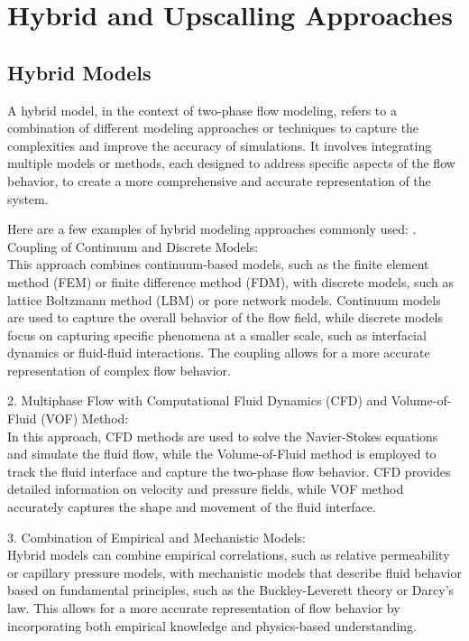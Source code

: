 \documentclass[letterpaper,12pt]{article}
\begin{document}
	
	\section{Hybrid and Upscalling Approaches}
	
	\subsection{Hybrid Models}
	  A hybrid model, in the context of two-phase flow modeling, refers to a combination of different modeling approaches or techniques to capture the complexities and improve the accuracy of simulations. It involves integrating multiple models or methods, each designed to address specific aspects of the flow behavior, to create a more comprehensive and accurate representation of the system.\smallskip
	
	 Here are a few examples of hybrid modeling approaches commonly used:
	. Coupling of Continuum and Discrete Models: \\
		This approach combines continuum-based models, such as the finite element method (FEM) or finite difference method (FDM), with discrete models, such as lattice Boltzmann method (LBM) or pore network models. Continuum models are used to capture the overall behavior of the flow field, while discrete models focus on capturing specific phenomena at a smaller scale, such as interfacial dynamics or fluid-fluid interactions. The coupling allows for a more accurate representation of complex flow behavior.
	
	2. Multiphase Flow with Computational Fluid Dynamics (CFD) and Volume-of-Fluid (VOF) Method:\\
		 In this approach, CFD methods are used to solve the Navier-Stokes equations and simulate the fluid flow, while the Volume-of-Fluid method is employed to track the fluid interface and capture the two-phase flow behavior. CFD provides detailed information on velocity and pressure fields, while VOF method accurately captures the shape and movement of the fluid interface.
	
	3. Combination of Empirical and Mechanistic Models: \\
		Hybrid models can combine empirical correlations, such as relative permeability or capillary pressure models, with mechanistic models that describe fluid behavior based on fundamental principles, such as the Buckley-Leverett theory or Darcy's law. This allows for a more accurate representation of flow behavior by incorporating both empirical knowledge and physics-based understanding.
		\smallskip
	
\end{document}
